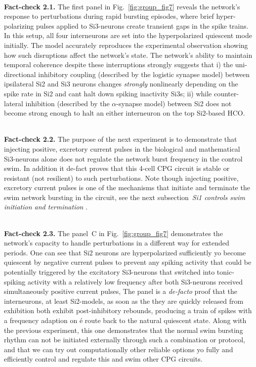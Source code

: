 \documentclass[nofootinbib,aip,amsmath,amssymb,reprint,twocolumn,10pt]{revtex4-2}
\begin{document}
~\\
{\bf Fact-check 2.1.} The first panel in Fig.~\ref{fig:group_fig7} reveals the network's response to perturbations during rapid bursting episodes, where brief hyper-polarizing pulses applied to Si3-neurons create transient gaps in the spike trains. In this setup, all four interneurons are set into the hyperpolarized quiescent mode initially. The model accurately reproduces the experimental observation showing how such disruptions affect the network's state. The network's ability to maintain temporal coherence despite these interruptions strongly suggests that i)  the uni-directional inhibitory coupling (described by the logistic synapse model) between ipsilateral Si2 and Si3 neurons changes {\em strongly} nonlinearly depending on the spike rate in Si2 and cant halt down spiking inactivity Si3s; ii) while counter-lateral inhibition (described by the $\alpha$-synapse model) between Si2 does not become strong enough to halt an either interneuron on the top Si2-based HCO. 

~\\
{\bf Fact-check 2.2.} The purpose of the next experiment is to demonstrate that injecting positive, excretory current pulses in the biological and mathematical Si3-neurons alone does not regulate the network burst frequency in the control swim. In addition it de-fact proves that this 4-cell CPG circuit is stable or resistant (not resilient) to such perturbations. Note though injecting positive, excretory current pulses is one of the mechanisms that initiate and terminate the swim network bursting in the circuit, see the next subsection~{\em Si1 controls swim initiation and termination} . 


~\\
{\bf Fact-check 2.3.} The panel~C in Fig.~\ref{fig:group_fig7} demonstrates the network's capacity to handle perturbations in a different way for extended periods. One can see that Si2 neurons are hyperpolarized sufficiently yo become quiescent by negative current pulses to prevent any spiking activity that could be potentially triggered by the excitatory Si3-neurons that switched into tonic-spiking activity with a relatively low frequency after both Si3-neurons received simultaneously positive current pulses, The panel is a {\em de-facto} proof that the interneurons, at least Si2-models, as soon as the they are quickly released from exhibition both exhibit post-inhibitory rebounds, producing a train of spikes with a frequency adaption on \'e route back to the natural quiescent state.  Along with the previous experiment, this one demonstrates that the normal swim bursting rhythm can not be initiated externally through such a combination or protocol, and that we can try out computationally other reliable options yo fully and efficiently control and regulate this and swim other CPG circuits.        
\end{document}
